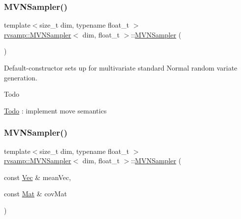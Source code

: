\subsubsection{\texorpdfstring{M\+V\+N\+Sampler()}{MVNSampler()}\hspace{0.1cm}{\footnotesize\ttfamily [1/2]}}
{\footnotesize\ttfamily template$<$size\+\_\+t dim, typename float\+\_\+t $>$ \\
\hyperlink{classrvsamp_1_1MVNSampler}{rvsamp\+::\+M\+V\+N\+Sampler}$<$ dim, float\+\_\+t $>$\+::\hyperlink{classrvsamp_1_1MVNSampler}{M\+V\+N\+Sampler} (\begin{DoxyParamCaption}{ }\end{DoxyParamCaption})}



Default-\/constructor sets up for multivariate standard Normal random variate generation. 

\begin{DoxyRefDesc}{Todo}
\item[\hyperlink{todo__todo000004}{Todo}]\+: implement move semantics \end{DoxyRefDesc}
\mbox{\label{classrvsamp_1_1MVNSampler_ac41aa5fc1e96bdd0f1577f8382958e7e}} 
\subsubsection{\texorpdfstring{M\+V\+N\+Sampler()}{MVNSampler()}\hspace{0.1cm}{\footnotesize\ttfamily [2/2]}}
{\footnotesize\ttfamily template$<$size\+\_\+t dim, typename float\+\_\+t $>$ \\
\hyperlink{classrvsamp_1_1MVNSampler}{rvsamp\+::\+M\+V\+N\+Sampler}$<$ dim, float\+\_\+t $>$\+::\hyperlink{classrvsamp_1_1MVNSampler}{M\+V\+N\+Sampler} (\begin{DoxyParamCaption}\item[{const \hyperlink{classrvsamp_1_1MVNSampler_a1110bc1695c5c959914602dbaf2f6878}{Vec} \&}]{mean\+Vec,  }\item[{const \hyperlink{classrvsamp_1_1MVNSampler_ad6891a72b508fd59263c6d62b6bffd14}{Mat} \&}]{cov\+Mat }\end{DoxyParamCaption})}



